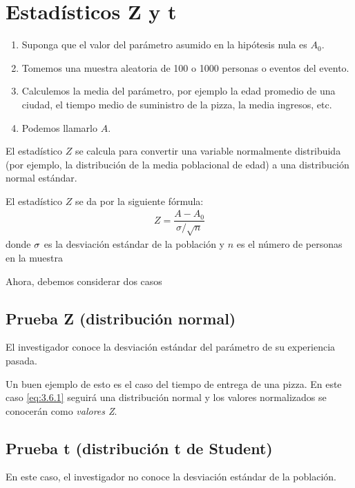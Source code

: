 \section*{Estadísticos Z y t}

\begin{enumerate}
	\item Suponga que el valor del parámetro asumido en la hipótesis nula es $A_0$. 
	\item Tomemos
	una muestra aleatoria de 100 o 1000 personas o eventos del evento. 
	\item Calculemos
	la media del parámetro, por ejemplo la edad promedio de una ciudad, el tiempo medio de suministro de la pizza, la media
	ingresos, etc. 
	\item Podemos llamarlo $A$.
\end{enumerate}




El estadístico $Z$ se calcula para convertir una variable normalmente distribuida (por ejemplo, la distribución de la media poblacional de edad) a una distribución normal estándar.


El estadístico $Z$ se da por la siguiente fórmula:
\begin{align}
	\label{eq:3.6.1}
	Z=\dfrac{A-A_{0}}{{\sigma}/{\sqrt{n}}}
\end{align}
donde $\sigma$ es la desviación estándar de la población y $n$ es el número de personas en la muestra


Ahora, debemos considerar dos casos

\subsection*{Prueba Z (distribución normal)}
El investigador conoce la desviación estándar del parámetro de su experiencia pasada.



Un buen ejemplo de esto es el caso del tiempo de entrega de una pizza.  En este caso \eqref{eq:3.6.1} seguirá una distribución normal y los valores normalizados se conocerán como \emph{valores Z}.

\subsection*{Prueba t (distribución t de Student) }
En este caso, el investigador no conoce la desviación estándar de la población.



